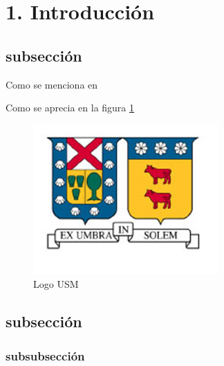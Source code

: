 \section{1. Introducción}
\subsection{subsección}

Como se menciona en \cite{method}\cite{modnegweb}\cite{modnegweb2}

Como se aprecia en la figura \ref{usm}

\begin{figure}[H]
\centering
\includegraphics[scale=1]{fig/usmLogo}
\caption{Logo USM}
\label{usm}
\end{figure}

\subsection{subsección}

\subsubsection{subsubsección}
